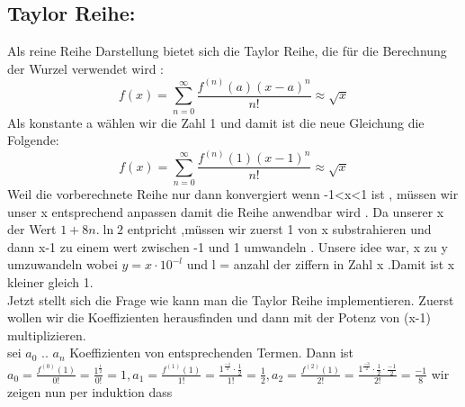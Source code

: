 \documentclass[course=erap]{aspdoc}
\begin{document}
\subsection{Taylor Reihe:}
Als reine Reihe Darstellung bietet sich die Taylor Reihe, die für die Berechnung der Wurzel verwendet wird \cite{TaylorseriesApprox}:
\begin{equation} \label{eq2}
    f(x) = \sum_{n=0}^{\infty} \frac{f^{(n)}(a)(x-a)^n}{n!}  \approx {\sqrt{x}}
\end{equation}
Als konstante a wählen wir die Zahl 1 und damit ist die neue Gleichung die Folgende:
\begin{equation} \label{eq3}
    f(x) = \sum_{n=0}^{\infty} \frac{f^{(n)}(1)(x-1)^n}{n!}  \approx {\sqrt{x}}
\end{equation}
Weil die vorberechnete Reihe nur dann konvergiert wenn -1<x<1 ist \cite{TaylorExpansion}, müssen wir unser x entsprechend anpassen damit die Reihe anwendbar wird . Da unserer x der Wert $1+8n.\ln{2}$ entpricht ,müssen wir zuerst 1 von x substrahieren und dann x-1 zu einem wert zwischen -1 und 1 umwandeln . Unsere idee war, x zu y umzuwandeln wobei  $  y= x \cdot 10^{-l}$ und l = anzahl der ziffern in Zahl x .Damit ist x kleiner gleich 1.
\\Jetzt stellt sich die Frage wie kann man  die Taylor Reihe implementieren. Zuerst wollen wir die Koeffizienten herausfinden und
dann mit der Potenz von (x-1) multiplizieren.
\\ sei $a_{0}$ .. $a_{n}$ Koeffizienten von entsprechenden Termen. Dann ist
\\
$
    a_0=\frac{f^{(0)}(1)}{0!}
    =\frac{1^{\frac{1}{2}}}{0!}
    =1 ,
    a_1=\frac{f^{(1)}(1)}{1!}
    =\frac{1^{\frac{-1}{2}}\cdot \frac{1}{2} }{1!}
    =\frac{1}{2} ,
    a_2=\frac{f^{(2)}(1)}{2!}
    =\frac{1^{\frac{-3}{2}}\cdot \frac{1}{2} \cdot \frac{-1}{2} }{2!}
    =\frac{-1}{8}
$
wir zeigen nun per induktion dass
\end{document}
